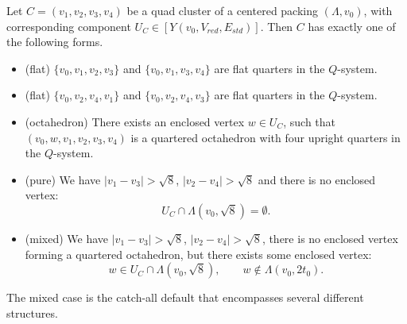 %

\begin{lemma}
Let $C=(v_1,v_2,v_3,v_4)$ be a quad cluster
of a centered packing $(\Lambda,v_0)$, with corresponding component 
$U_C\in [Y(v_0,V_{red},E_{std})]$.  
Then $C$ has
exactly one of the following forms.
\begin{itemize}
  \item (flat) $\{v_0,v_1,v_2,v_3\}$ and $\{v_0,v_1,v_3,v_4\}$ are flat
    quarters in the $Q$-system.
   \item (flat) $\{v_0,v_2,v_4,v_1\}$ and $\{v_0,v_2,v_4,v_3\}$ are flat
     quarters in the $Q$-system.
     \item (octahedron) There exists an enclosed vertex $w\in U_C$, 
       such that
       $(v_0,w,v_1,v_2,v_3,v_4)$ is a quartered octahedron with
       four upright quarters in the $Q$-system.
   \item (pure) We have $|v_1-v_3|>\sqrt8$, $|v_2-v_4|>\sqrt8$ and
     there is no enclosed vertex: 
        $$U_C\cap\Lambda(v_0,\sqrt8) = \emptyset.$$
    \item (mixed) We have $|v_1-v_3|>\sqrt8$, $|v_2-v_4|>\sqrt8$, there
      is no enclosed vertex forming a quartered octahedron, but
      there exists some enclosed vertex: 
        $$w \in U_C\cap\Lambda(v_0,\sqrt8),\qquad w\not\in \Lambda(v_0,2t_0).$$
\end{itemize}
\end{lemma}

The mixed case is the catch-all default that encompasses several
different structures.


